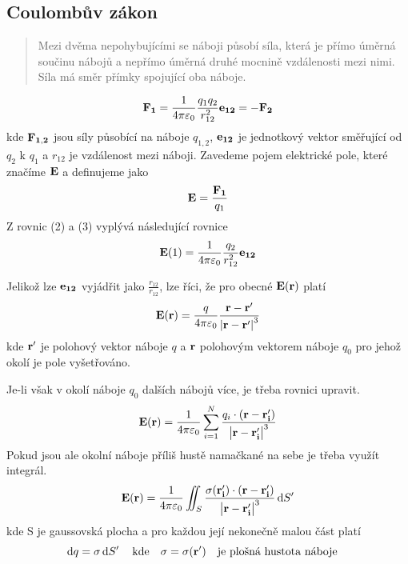 \documentclass[titlepage]{article}
\begin{document}
    		\subsection{Coulombův zákon}
    			\begin{quote}
    				Mezi dvěma nepohybujícími se náboji působí síla, která je přímo úměrná součinu nábojů a nepřímo úměrná druhé mocnině vzdálenosti mezi nimi. Síla má směr přímky spojující oba náboje.
    			\end{quote}
    			
    			\begin{equation}
    				\vb{F_1} = \frac{1}{4 \pi \varepsilon_0} \frac{q_1 q_2}{r_{12}^2} \vb{e_{12}} = -\vb{F_2}
    			\end{equation}
    			kde $\vb{F_{1,2}}$ jsou síly působící na náboje $q_{1,2}$, $\vb{e_{12}}$ je jednotkový vektor směřující od $q_2$ k $q_1$ a $r_{12}$ je vzdálenost mezi náboji.
    			Zavedeme pojem elektrické pole, které značíme $\vb{E}$ a definujeme jako
    			\begin{equation}
    				\vb{E} = \frac{\vb{F_1}}{q_1}
    			\end{equation}
    			Z rovnic (2) a (3) vyplývá následující rovnice
    			\begin{equation}
    				\vb{E}(1) = \frac{1}{4 \pi \varepsilon_0} \frac{q_2}{r_{12}^2}\vb{e_{12}}
    			\end{equation}
    			
    			Jelikož lze $\vb{e_{12}}$ vyjádřit jako $\frac{r_{12}}{r_{12}}$, lze říci, že pro obecné $\vb{E}(\vb{r})$ platí
    			\begin{equation}
    				\vb{E}(\vb{r}) = \frac{q}{4 \pi \varepsilon_0} \frac{\vb{r}-\vb{r'}}{\abs{\vb{r}-\vb{r'}}^3}
    			\end{equation}
    			kde $\vb{r'}$ je polohový vektor náboje $q$ a $\vb{r}$ polohovým vektorem náboje $q_0$ pro jehož okolí je pole vyšetřováno.
    			
    			Je-li však v okolí náboje $q_0$ dalších nábojů více, je třeba rovnici upravit.
    			\begin{equation}
    				\vb{E}(\vb{r}) = \frac{1}{4 \pi \varepsilon_0} \sum_{i=1}^N \frac{q_i \cdot (\vb{r}-\vb{r_i'})}{\abs{\vb{r}-\vb{r_i'}}^3}
    			\end{equation}
    			Pokud jsou ale okolní náboje příliš hustě namačkané na sebe je třeba využít integrál.
    			\begin{equation}
    				\vb{E}(\vb{r}) = \frac{1}{4 \pi \varepsilon_0} \iint_S \frac{\sigma (\vb{r_i'})  \cdot (\vb{r}-\vb{r_i'})}{\abs{\vb{r}-\vb{r_i'}}^3}\dd{S'}
    			\end{equation}
    			kde S je gaussovská plocha a pro každou její nekonečně malou část platí
    			\begin{equation*}
    				\dd{q} = \sigma \dd{S'} \qq{kde} \sigma = \sigma (\vb{r'}) \qq{je plošná hustota náboje}
    			\end{equation*}
    			
\end{document}
